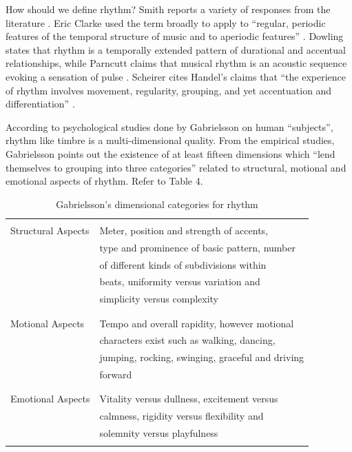 How should we define rhythm?  Smith reports a variety of responses from the literature
\cite[p. 9-10]{Smith:99}. Eric Clarke used the term broadly to apply
to ``regular, periodic features of the temporal structure of music and
to aperiodic features'' \cite{Clarke:85structure}. Dowling states that
rhythm is a temporally extended pattern of durational and accentual 
relationships, while Parncutt claims that musical rhythm is an
acoustic sequence evoking a sensation of pulse
\cite[p. 451]{Parncutt:94}.  Scheirer cites Handel's claims that
``the experience of rhythm involves movement, regularity, grouping,
and yet accentuation and differentiation'' \cite{Scheirer:98tempo}.

According to psychological studies done by Gabrielsson on human 
``subjects'', rhythm like timbre is a multi-dimensional quality. 
From the empirical studies, Gabrielsson points out the existence of at 
least fifteen dimensions which ``lend themselves to grouping into 
three categories'' related to structural, motional and emotional
aspects of rhythm. Refer to Table 4.

\begin{table}
\begin{tabular}{|l|l|}\hline %
& \\
Structural Aspects     & Meter, position and strength of accents, \\
                       & type and prominence of basic pattern, number \\
                       & of different kinds of subdivisions within \\
                       & beats, uniformity versus variation and  \\
                       & simplicity versus complexity \\
                       & \\ \hline
                       & \\

Motional Aspects       & Tempo and overall rapidity, however motional \\
                       & characters exist such as walking, dancing,  \\
                       & jumping, rocking, swinging, graceful and driving \\
                       & forward \\
                       & \\ \hline
                       &  \\

Emotional Aspects      & Vitality versus dullness, excitement versus \\
                       & calmness, rigidity versus flexibility and  \\
                       & solemnity versus playfulness \\
                       & \\ \hline
\end{tabular}
\caption {Gabrielsson's dimensional categories for rhythm \cite[p. 107]{Gabrielsson:89}}
\end{table}


